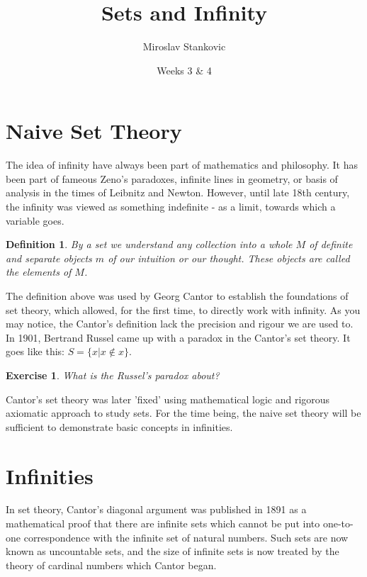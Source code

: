 \documentclass[11pt,a5paper]{article}
\title{\textbf{Sets and Infinity}}
\date{Weeks 3 \& 4}
\author{Miroslav Stankovic\\}
\newtheorem{definition}{Definition}
\newtheorem{exercise}{Exercise}
\begin{document}
\maketitle


\section{Naive Set Theory}

The idea of infinity have always been part of mathematics and philosophy. It has been part of fameous Zeno's paradoxes, infinite lines in geometry, or basis of analysis in the times of Leibnitz and Newton. However, until late 18th century, the infinity was viewed as something indefinite - as a limit, towards which a variable goes.

\begin{definition}
By a \emph{set} we understand any collection into a whole $M$ of definite and separate objects $m$ of our intuition or our thought. These objects are called the \emph{elements} of $M$.
\end{definition}

\noindent The definition above was used by Georg Cantor to establish the foundations of set theory, which allowed, for the first time, to directly work with infinity. As you may notice, the Cantor's definition lack the precision and rigour we are used to. In 1901, Bertrand Russel came up with a paradox in the Cantor's set theory. It goes like this: $S=\{x|x\notin x\}$.

\begin{exercise} 
What is the Russel's paradox about?
\end{exercise}

\noindent Cantor's set theory was later 'fixed' using mathematical logic and rigorous axiomatic approach to study sets. For the time being, the naive set theory will be sufficient to demonstrate basic concepts in infinities.

\section{Infinities}

\noindent In set theory, Cantor's diagonal argument was published in 1891 as a mathematical proof that there are infinite sets which cannot be put into one-to-one correspondence with the infinite set of natural numbers. Such sets are now known as uncountable sets, and the size of infinite sets is now treated by the theory of cardinal numbers which Cantor began. 
\end{document}
